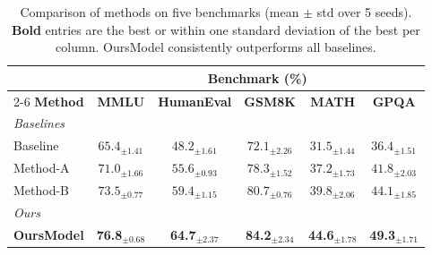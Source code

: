\documentclass[10pt]{article}
\begin{document}
\begin{table}[ht]
\centering
\renewcommand{\arraystretch}{1.25}
\begin{tabular}{lccccc}
\toprule
 & \multicolumn{5}{c}{Benchmark (\%)} \\
\cmidrule(lr){2-6}
\textbf{Method} & \textbf{MMLU} & \textbf{HumanEval} & \textbf{GSM8K} & \textbf{MATH} & \textbf{GPQA} \\
\midrule
\multicolumn{6}{l}{\textit{\small Baselines}} \\
Baseline & $65.4_{\pm 1.41}$ & $48.2_{\pm 1.61}$ & $72.1_{\pm 2.26}$ & $31.5_{\pm 1.44}$ & $36.4_{\pm 1.51}$ \\
Method-A & $71.0_{\pm 1.66}$ & $55.6_{\pm 0.93}$ & $78.3_{\pm 1.52}$ & $37.2_{\pm 1.73}$ & $41.8_{\pm 2.03}$ \\
Method-B & $73.5_{\pm 0.77}$ & $59.4_{\pm 1.15}$ & $80.7_{\pm 0.76}$ & $39.8_{\pm 2.06}$ & $44.1_{\pm 1.85}$ \\
\midrule
\multicolumn{6}{l}{\textit{\small Ours}} \\
\textbf{OursModel} & \textbf{76.8}$_{\pm 0.68}$ & \textbf{64.7}$_{\pm 2.37}$ & \textbf{84.2}$_{\pm 2.34}$ & \textbf{44.6}$_{\pm 1.78}$ & \textbf{49.3}$_{\pm 1.71}$ \\
\bottomrule
\end{tabular}
\caption{Comparison of methods on five benchmarks (mean $\pm$ std over 5 seeds). \textbf{Bold} entries are the best or within one standard deviation of the best per column. OursModel consistently outperforms all baselines.}
\end{table}
\end{document}
